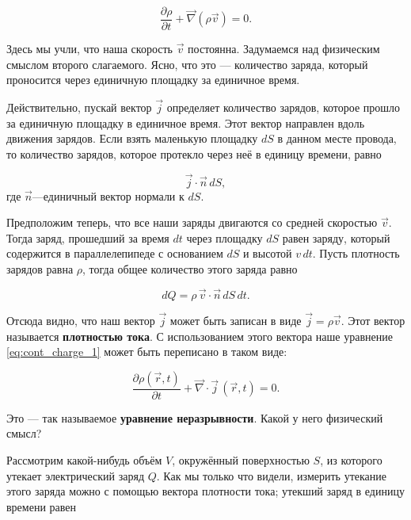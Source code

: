 \documentclass[a4paper,12pt]{article}
\numberwithin{equation}{section}
\newcommand{\pt}{\partial}
\newcommand{\vn}{\vec{\nabla}}
\begin{document}
\begin{equation}
  \label{eq:cont_charge_1}
  \frac{\pt \rho}{\pt t} + \vn ( \rho \vec{v}) =0.
\end{equation}

Здесь мы учли, что наша скорость $\vec{v}$ постоянна. Задумаемся над
физическим смыслом второго слагаемого. Ясно, что это — количество
заряда, который проносится через единичную площадку за единичное
время. 

Действительно, пускай вектор $\vec{j}$ определяет количество зарядов,
которое прошло за единичную площадку в единичное время. Этот вектор
направлен вдоль движения зарядов. Если взять маленькую площадку $dS$ в
данном месте провода, то количество зарядов, которое протекло через
неё в единицу времени, равно

\begin{equation}
  \label{eq:def_j_1}
  \vec{j} \cdot \vec{n}\, dS,
\end{equation}
где $\vec{n}$---единичный вектор нормали к $dS$. 

Предположим теперь, что все наши заряды двигаются со средней скоростью
$\vec{v}$. Тогда заряд, прошедший за время $dt$ через площадку $dS$
равен заряду, который содержится в параллелепипеде с основанием $dS$ и
высотой $v\, dt$. Пусть плотность зарядов равна $\rho$, тогда общее
количество этого заряда равно

\begin{equation}
  \label{eq:def_j_2}
  dQ = \rho \, \vec{v} \cdot \vec{n} \, dS\, dt.
\end{equation}

Отсюда видно, что наш вектор $\vec{j}$ может быть записан в виде
$\vec{j} = \rho \vec{v}$. Этот вектор называется \textbf{плотностью
  тока}. С использованием этого вектора наше уравнение
\eqref{eq:cont_charge_1} может быть переписано в таком виде: 

\begin{equation}
  \label{eq:cont_charge_2}
  \frac{\pt \rho (\vec{r},t)}{\pt t} + \vn \cdot \vec{j} \,(\vec{r},t)=0.
\end{equation}

Это — так называемое \textbf{уравнение неразрывности}. Какой у него
физический смысл? 

Рассмотрим какой-нибудь объём $V$, окружённый поверхностью $S$, из
которого утекает электрический заряд $Q$. Как мы только что видели,
измерить утекание этого заряда можно с помощью вектора плотности тока;
утекший заряд в единицу времени равен 
\end{document}
